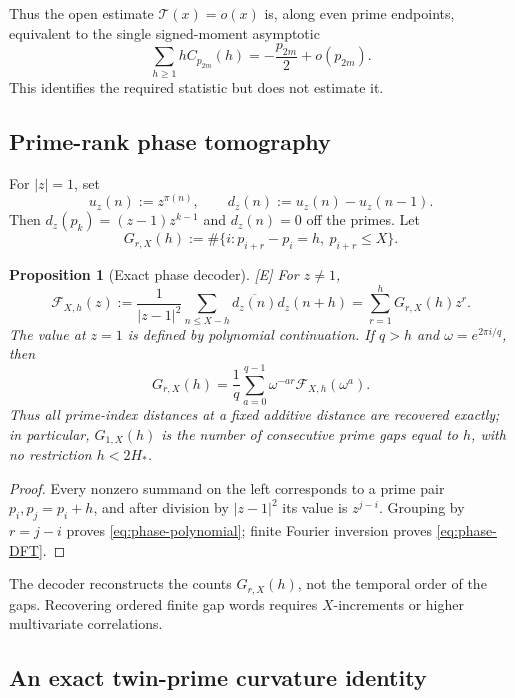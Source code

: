 \documentclass[11pt]{article}
\newtheorem{proposition}[theorem]{Proposition}
\theoremstyle{definition}
\theoremstyle{remark}
\newcommand{\status}[1]{\textnormal{\textcolor{accent}{\footnotesize[#1]}}}
\begin{document}
Thus the open estimate $\mathcal T(x)=o(x)$ is, along even prime endpoints,
equivalent to the single signed-moment asymptotic
\begin{equation}\label{eq:T-moment-equivalence}
 \sum_{h\ge1}hC_{p_{2m}}(h)=-\frac{p_{2m}}2+o(p_{2m}).
\end{equation}
This identifies the required statistic but does not estimate it.

\subsection{Prime-rank phase tomography}

For $|z|=1$, set
\[
 u_z(n):=z^{\pi(n)},\qquad d_z(n):=u_z(n)-u_z(n-1).
\]
Then $d_z(p_k)=(z-1)z^{k-1}$ and $d_z(n)=0$ off the primes.  Let
\[
 G_{r,X}(h):=
 \#\{i:p_{i+r}-p_i=h,\ p_{i+r}\le X\}.
\]

\begin{proposition}[Exact phase decoder]\label{prop:phase-tomography}
\status{E}
For $z\ne1$,
\begin{equation}\label{eq:phase-polynomial}
 \mathcal F_{X,h}(z):=
 \frac1{|z-1|^2}\sum_{n\le X-h}\overline{d_z(n)}d_z(n+h)
 =\sum_{r=1}^{h}G_{r,X}(h)z^r.
\end{equation}
The value at $z=1$ is defined by polynomial continuation.  If $q>h$ and
$\omega=e^{2\pi i/q}$, then
\begin{equation}\label{eq:phase-DFT}
 G_{r,X}(h)=\frac1q\sum_{a=0}^{q-1}
 \omega^{-ar}\mathcal F_{X,h}(\omega^a).
\end{equation}
Thus all prime-index distances at a fixed additive distance are recovered exactly; in
particular, $G_{1,X}(h)$ is the number of consecutive prime gaps equal to $h$, with no
restriction $h<2H_*$.
\end{proposition}

\begin{proof}
Every nonzero summand on the left corresponds to a prime pair
$p_i,p_j=p_i+h$, and after division by $|z-1|^2$ its value is $z^{j-i}$.
Grouping by $r=j-i$ proves \eqref{eq:phase-polynomial}; finite Fourier inversion proves
\eqref{eq:phase-DFT}.
\end{proof}

The decoder reconstructs the counts $G_{r,X}(h)$, not the temporal order of the gaps.
Recovering ordered finite gap words requires $X$-increments or higher multivariate
correlations.

\subsection{An exact twin-prime curvature identity}
\end{document}
